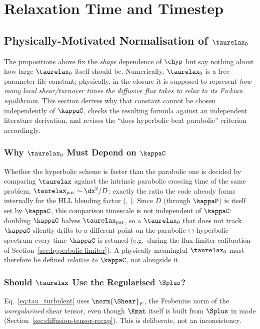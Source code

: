 \section{Relaxation Time and Timestep}

\subsection{Physically-Motivated Normalisation of $\taurelax_0$}
\label{sec:tau0-physical}

The propositions above fix the \emph{shape} dependence of $\chyp$ but say
nothing about how large $\taurelax_0$ itself should be. Numerically,
$\taurelax_0$ is a free parameter-file constant; physically, in the
 closure it is supposed to represent \emph{how many
local shear/turnover times the diffusive flux takes to relax to its
Fickian equilibrium}. This section derives why that constant cannot be
chosen independently of $\kappaC$, checks the resulting formula against an
independent literature derivation, and revises the ``does hyperbolic beat
parabolic'' criterion accordingly.

\subsubsection{Why $\taurelax_0$ Must Depend on $\kappaC$}
\label{sec:tau0-motivation}
Whether the hyperbolic scheme is faster than the parabolic one is decided
by comparing $\taurelax$ against the intrinsic parabolic crossing time of
the same problem, $\taurelax_{\rm par}\sim\dx^2/D$: exactly the ratio the
code already forms internally for the HLL blending factor
(,
). Since $D$ (through $\kappaP$) is itself
set by $\kappaC$, this comparison timescale is not independent of
$\kappaC$: doubling $\kappaC$ halves $\taurelax_{\rm par}$, so a
$\taurelax_0$ that does not track $\kappaC$ silently drifts to a different
point on the parabolic$\leftrightarrow$hyperbolic spectrum every time
$\kappaC$ is retuned (e.g.\ during the flux-limiter calibration of
Section~\ref{sec:hyperbolic-limiter}). A physically meaningful
$\taurelax_0$ must therefore be defined \emph{relative to} $\kappaC$, not
alongside it.

\subsubsection{Should $\taurelax$ Use the Regularised $\Splus$?}
\label{sec:tau-no-regularisation}
Eq.~\eqref{eq:tau_turbulent} uses $\norm{\Shear}_F$, the Frobenius norm of
the \emph{unregularised} shear tensor, even though $\Kmat$ itself is built
from $\Splus$ in  mode
(Section~\ref{sec:diffusion-tensor-recap}). This is deliberate, not an
inconsistency.

